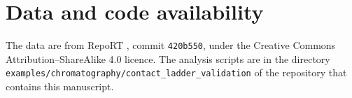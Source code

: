 \documentclass[11pt,a4paper]{article}
\theoremstyle{definition}
\theoremstyle{remark}
\begin{document}
\section*{Data and code availability}
The data are from RepoRT \citep{kretschmer2024}, commit \texttt{420b550}, under the Creative Commons Attribution--ShareAlike 4.0 licence.
The analysis scripts are in the directory \texttt{examples/\allowbreak chromatography/\allowbreak contact\_ladder\_validation} of the repository that contains this manuscript.



\end{document}
